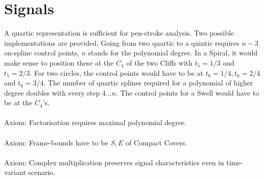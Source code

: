 \documentclass[a4paper,portrait]{report}
\begin{document}
\chapter{Signals}
A quartic representation is sufficient for pen-stroke analysis. Two possible implementations are provided. Going from two quartic to a quintic requires $n-3$ on-spline control points, $n$ stands for the polynomial degree. In a Spiral, it would make sense to position these at the $C_{4}$ of the two Cliffs with $t_{5}=1/3$ and $t_{5}=2/3$. For two circles, the control points would have to be at $t_{6}=1/4,t_{6}=2/4$ and $t_{6}=3/4$. The number of quartic splines required for a polynomial of higher degree doubles with every step $4...n$. The control points for a Swell would have to be at the $C_{4}$'s.\\\\
Axiom: Factorisation requires maximal polynomial degree.\\\\
Axiom: Frame-bounds have to be $S,E$ of Compact Covers.\\\\
Axiom: Complex multiplication preserves signal characteristics even in time-variant scenario.\\\\
\iffalse
\printbibliography
\fi
{}

\end{document}
